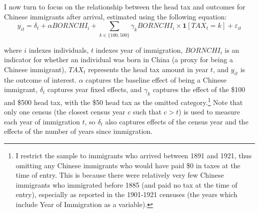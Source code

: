 \begin{table}[!h]
    \centering 
    \renewcommand{\arraystretch}{1.5}
\end{table}

I now turn to focus on the relationship between the head tax and outcomes for Chinese immigrants after arrival, estimated using the following equation: 
\begin{equation}
    \label{eq:did}
    y_{it} = \delta_t + \alpha BORNCHI_i + \sum_{k \in \{100, 500\}} \gamma_k BORNCHI_i \times \mathbf{1}[TAX_t = k] + \varepsilon_{it}
\end{equation}

where $i$ indexes individuals, $t$ indexes year of immigration, $BORNCHI_i$ is an indicator for whether an individual was born in China (a proxy for being a Chinese immigrant), $TAX_t$ represents the head tax amount in year $t$, and $y_{it}$ is the outcome of interest. $\alpha$ captures the baseline effect of being a Chinese immigrant, $\delta_t$ captures year fixed effects, and $\gamma_k$ captures the effect of the \$100 and \$500 head tax, with the \$50 head tax as the omitted category.\footnote{I restrict the sample to immigrants who arrived between 1891 and 1921, thus omitting any Chinese immigrants who would have paid \$0 in taxes at the time of entry. This is because there were relatively very few Chinese immigrants who immigrated before 1885 (and paid no tax at the time of entry), especially as reported in the 1901-1921 censuses (the years which include Year of Immigration as a variable).} 
Note that only one census (the closest census year $c$ such that $c > t$) is used to measure each year of immigration $t$, so $\delta_t$ also captures effects of the census year and the effects of the number of years since immigration. 

